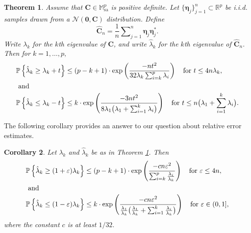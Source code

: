 \documentclass[11pt,letterpaper,twoside,reqno,nosumlimits]{amsart}
\renewcommand{\star}{*}
\newcommand{\mat}[1]{\ensuremath{\bm{#1}}} %
\renewcommand{\vec}[1]{\ensuremath{\bm{#1}}}
\newcommand{\Prob}[1]{\ensuremath{\mathbb{P}\left\{#1\right\}}}
\newcommand{\R}{\ensuremath{\mathbb{R}}}
\newcommand{\samats}[1]{\ensuremath{\mathbb{M}^{#1}_{\mathrm{sa}}}}
\newtheorem{thm}{Theorem}
\newtheorem{cor}[thm]{Corollary}
\theoremstyle{remark}
\numberwithin{equation}{section}
\numberwithin{thm}{section}
\numberwithin{prop}{section}
\numberwithin{defn}{section}
\numberwithin{remark}{section}
\begin{document}
\begin{thm}
\label{thm:covarest}
Assume that $\mat{C} \in \samats{p}$ is positive definite. Let $\{\vec{\eta}_j\}_{j=1}^n \subset \R^p$ be i.i.d. samples drawn from a $\mathcal{N}(\vec{0}, \mat{C})$ distribution. Define 
\[
\widehat{\mat{C}}_n = \frac{1}{n} \sum\nolimits_{j=1}^n \vec{\eta}_j\vec{\eta}_j^\star.
\]
Write $\lambda_k$ for the $k$th eigenvalue of $\mat{C}$, and write $\hat{\lambda}_k$ for the $k$th eigenvalue of $\widehat{\mat{C}}_n.$ Then for $k=1,\ldots,p,$
\begin{align*}
\Prob{\hat{\lambda}_k \geq \lambda_k + t} & \leq  (p-k+1) \cdot \exp\left( \displaystyle \frac{-nt^2}{32 \lambda_k \sum_{i=k}^p \lambda_i} \right) \quad \text{for } t \leq 4 n \lambda_k, \\
\intertext{ and }
\Prob{\hat{\lambda}_k \leq \lambda_k - t} & \leq  k \cdot \exp\left( \displaystyle \frac{-3nt^2}{8 \lambda_1 \big(\lambda_1 + \sum_{i=1}^k \lambda_i \big) } \right) \quad \text{for } t \leq n\big(\lambda_1 + \sum_{i=1}^k \lambda_i\big).
\end{align*}

\end{thm}

The following corollary provides an answer to our question about relative error estimates.
\begin{cor}
\label{cor:relerrcovarest}
Let $\lambda_k$ and $\hat{\lambda}_k$ be as in Theorem \ref{thm:covarest}. Then 
\begin{align*}
\Prob{\hat{\lambda}_k \geq (1 + \varepsilon) \lambda_k} & \leq 
(p-k+1) \cdot \exp\left(\frac{- c n \varepsilon^2 }{\sum\nolimits_{i=k}^p \frac{\lambda_i}{\lambda_k}} \right) \quad \text{for } \varepsilon \leq 4 n, \\
\intertext{ and }
\Prob{\hat{\lambda}_k  \leq (1 - \varepsilon) \lambda_k} & \leq k \cdot \exp\left( \frac{-c n \varepsilon^2}{\tfrac{\lambda_1}{\lambda_k}\big( \tfrac{\lambda_1}{\lambda_k} + \sum_{i=1}^k \frac{\lambda_i}{\lambda_k} \big)} \right) \quad \text{for } \varepsilon \in (0,1],
\end{align*}
where the constant $c$ is at least $1/32.$
\end{cor}
\end{document}
